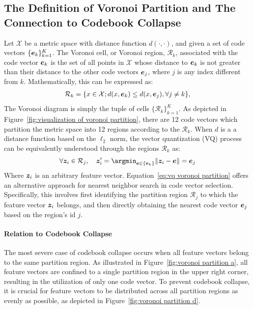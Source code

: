 \subsection{The Definition of Voronoi Partition and The Connection to Codebook Collapse}
\label{appendix:voronoi partition definition}
Let $\mathcal{X}$ be a metric space with distance function $d(\cdot, \cdot)$, and given a set of code vectors $\{\bm{e}_k\}_{k=1}^K$. The Voronoi cell, or Voronoi region, $\mathcal{R}_k$, associated with the code vector $\bm{e}_k$ is the set of all points in 
$\mathcal{X}$ whose distance to $\bm{e}_k$ is not greater than their distance to the other code vectors $\bm{e}_j$, where $j$ is any index different from $k$. Mathematically, this can be expressed as:
\begin{align}
\mathcal{R}_k = \{x \in \mathcal{X}; d(x, \bm{e}_k) \leq d(x, \bm{e}_j), \forall j \neq k\},
\end{align}
The Voronoi diagram is simply the tuple of cells $\{\mathcal{R}_k\}_{k=1}^K$. As depicted in Figure~\ref{fig:visualization of voronoi partition}, there are 12 code vectors which partition the metric space into 12 regions according to the $\mathcal{R}_k$. When $d$ is a a distance function based on the $\ell_2$ norm, the vector quantization (VQ) process can be equivalently understood through the regions $\mathcal{R}_k$ as:
\begin{align}
\label{eq:vq voronoi partition}
\forall \bz_i \in \mathcal{R}_j, \quad \bz_i' = \argmin_{\be\in\{\be_k\}}\norm{\bz_i-\be} = \be_j
\end{align}
Where $\bm{z}_i$ is an arbitrary feature vector.  Equation~\ref{eq:vq voronoi partition} offers an alternative approach for nearest neighbor search in code vector selection. Specifically, this involves first identifying the partition region $\mathcal{R}_j$ to which the feature vector $\bm{z}_i$ belongs, and then directly obtaining the nearest code vector $\bm{e}_j$ based on the region’s id $j$.

\paragraph{Relation to Codebook Collapse} 
The most severe case of codebook collapse occurs when all feature vectors belong to the same partition region. As illustrated in Figure~\ref{fig:voronoi partition a}, all feature vectors are confined to a single partition region in the upper right corner, resulting in the utilization of only one code vector. To prevent codebook collapse, it is crucial for feature vectors to be distributed across all partition regions as evenly as possible, as depicted in Figure~\ref{fig:voronoi partition d}.


